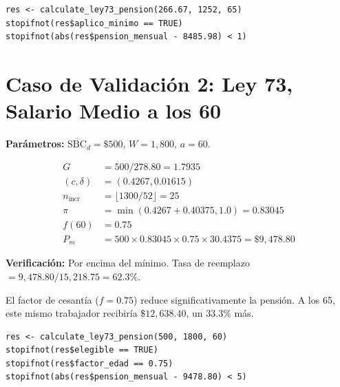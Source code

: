 \documentclass[11pt,a4paper]{report}
\theoremstyle{remark}
\begin{document}
\begin{tcolorbox}[colback=orange!5!white, colframe=orange!75!black, title=\textbf{Aplicaci\'on en C\'odigo}]
\begin{lstlisting}
res <- calculate_ley73_pension(266.67, 1252, 65)
stopifnot(res$aplico_minimo == TRUE)
stopifnot(abs(res$pension_mensual - 8485.98) < 1)
\end{lstlisting}
\end{tcolorbox}

\section{Caso de Validaci\'on 2: Ley 73, Salario Medio a los 60}

\begin{tcolorbox}[colback=blue!5!white, colframe=blue!75!black, title=\textbf{Definici\'on Formal}]
\textbf{Par\'ametros:} $\overline{\text{SBC}}_d = \$500$, $W = 1{,}800$, $a = 60$.

\begin{align}
G &= 500/278.80 = 1.7935 \\
(c, \delta) &= (0.4267, 0.01615) \\
n_{\text{incr}} &= \lfloor 1300/52 \rfloor = 25 \\
\pi &= \min(0.4267 + 0.40375, 1.0) = 0.83045 \\
f(60) &= 0.75 \\
P_m &= 500 \times 0.83045 \times 0.75 \times 30.4375 = \boxed{\$9{,}478.80}
\end{align}

\textbf{Verificaci\'on:} Por encima del m\'inimo. Tasa de reemplazo $= 9{,}478.80 / 15{,}218.75 = 62.3\%$.
\end{tcolorbox}

\begin{tcolorbox}[colback=green!5!white, colframe=green!50!black, title=\textbf{Intuici\'on}]
El factor de cesant\'ia ($f = 0.75$) reduce significativamente la pensi\'on. A los 65, este mismo trabajador recibir\'ia $\$12{,}638.40$, un 33.3\% m\'as.
\end{tcolorbox}

\begin{tcolorbox}[colback=orange!5!white, colframe=orange!75!black, title=\textbf{Aplicaci\'on en C\'odigo}]
\begin{lstlisting}
res <- calculate_ley73_pension(500, 1800, 60)
stopifnot(res$elegible == TRUE)
stopifnot(res$factor_edad == 0.75)
stopifnot(abs(res$pension_mensual - 9478.80) < 5)
\end{lstlisting}
\end{tcolorbox}
\end{document}
